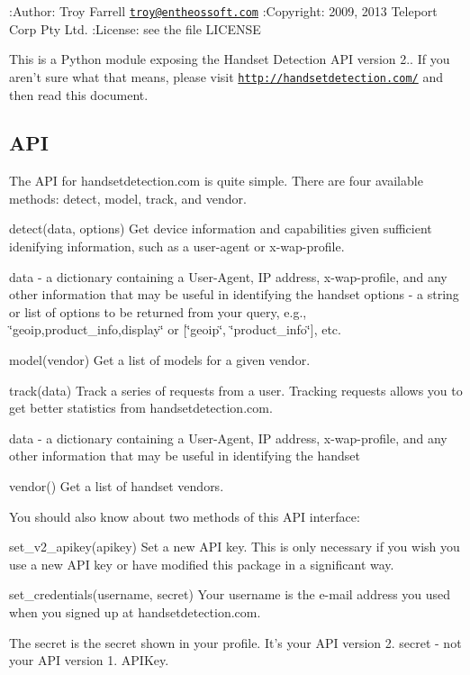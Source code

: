 \+:Author\+: Troy Farrell \href{mailto:troy@entheossoft.com}{\tt troy@entheossoft.\+com} \+:Copyright\+: 2009, 2013 Teleport Corp Pty Ltd. \+:License\+: see the file L\+I\+C\+E\+N\+S\+E

This is a Python module exposing the Handset Detection A\+P\+I version 2.. If you aren't sure what that means, please visit \href{http://handsetdetection.com/}{\tt http\+://handsetdetection.\+com/} and then read this document.

\subsection*{A\+P\+I }

The A\+P\+I for handsetdetection.\+com is quite simple. There are four available methods\+: detect, model, track, and vendor.

detect(data, options) Get device information and capabilities given sufficient idenifying information, such as a user-\/agent or x-\/wap-\/profile.

data -\/ a dictionary containing a User-\/\+Agent, I\+P address, x-\/wap-\/profile, and any other information that may be useful in identifying the handset options -\/ a string or list of options to be returned from your query, e.\+g., \char`\"{}geoip,product\+\_\+info,display\char`\"{} or \mbox{[}\char`\"{}geoip\char`\"{}, \char`\"{}product\+\_\+info\char`\"{}\mbox{]}, etc.

model(vendor) Get a list of models for a given vendor.

track(data) Track a series of requests from a user. Tracking requests allows you to get better statistics from handsetdetection.\+com.

data -\/ a dictionary containing a User-\/\+Agent, I\+P address, x-\/wap-\/profile, and any other information that may be useful in identifying the handset

vendor() Get a list of handset vendors.

You should also know about two methods of this A\+P\+I interface\+:

set\+\_\+v2\+\_\+apikey(apikey) Set a new A\+P\+I key. This is only necessary if you wish you use a new A\+P\+I key or have modified this package in a significant way.

set\+\_\+credentials(username, secret) Your username is the e-\/mail address you used when you signed up at handsetdetection.\+com.

The secret is the secret shown in your profile. It's your A\+P\+I version 2. secret -\/ not your A\+P\+I version 1. A\+P\+I\+Key.

